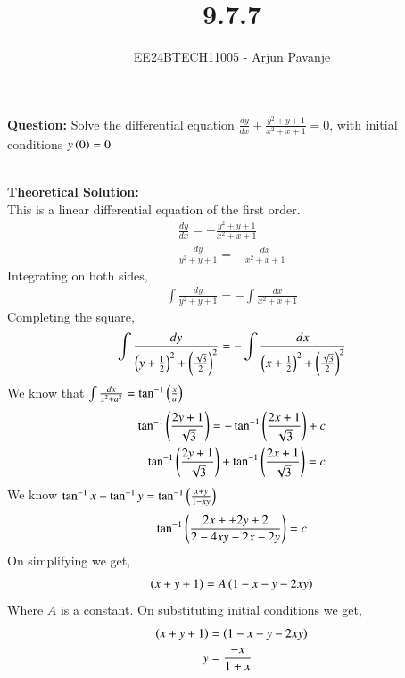 \documentclass[journal]{IEEEtran}
\begin{document}

\vspace{3cm}

\title{9.7.7}
\author{EE24BTECH11005 - Arjun Pavanje}
{\let\newpage\relax\maketitle}
\textbf{Question:}
Solve the differential equation $\frac{dy}{dx}+\frac{y^2+y+1}{x^2+x+1}=0$, with initial conditions $y\left(0\right)=0$

\solution\\
\textbf{Theoretical Solution:}\\
This is a linear differential equation of the first order.
\begin{align}
  \frac{dy}{dx}= -\frac{y^2+y+1}{x^2+x+1}\\
  \frac{dy}{y^2+y+1}=-\frac{dx}{x^2+x+1}
\end{align}
Integrating on both sides,
\begin{align}
  \int \frac{dy}{y^2+y+1}=-\int \frac{dx}{x^2+x+1}
\end{align}
Completing the square,
\begin{align}
  \int \frac{dy}{\left(y+\frac{1}{2}\right)^2 + \left(\frac{\sqrt{3}}{2}\right)^2}=-\int \frac{dx}{\left(x+\frac{1}{2}\right)^2 + \left(\frac{\sqrt{3}}{2}\right)^2}
\end{align}
We know that $\int \frac{dx}{x^2+a^2}=\tan^{-1}\left(\frac{x}{a}\right)$
\begin{align}
  \tan^{-1}\left(\frac{2y+1}{\sqrt{3}}\right)= -\tan^{-1}\left(\frac{2x+1}{\sqrt{3}}\right)+c\\
  \tan^{-1}\left(\frac{2y+1}{\sqrt{3}}\right)+\tan^{-1}\left(\frac{2x+1}{\sqrt{3}}\right)=c
\end{align}
We know $\tan^{-1}x + \tan^{-1}y = \tan^{-1}\left(\frac{x+y}{1-xy}\right)$
\begin{align}
  \tan^{-1}\left(\frac{2x++2y+2}{2-4xy-2x-2y}\right)=c
\end{align}
On simplifying we get,
\begin{align}
  \left(x+y+1\right)=A\left(1-x-y-2xy\right)
\end{align}
Where $A$ is a constant. On substituting initial conditions we get,
\begin{align}
  \left(x+y+1\right)&=\left(1-x-y-2xy\right)\\
  y&=\frac{-x}{1+x}
\end{align}
\end{document}
